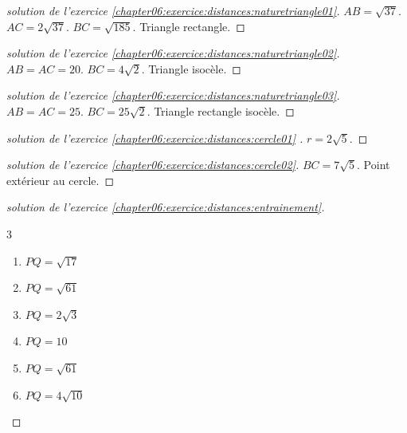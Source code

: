 \begin{proof}[solution de l'exercice \ref{chapter06:exercice:distances:naturetriangle01}]   
	$AB=\sqrt{37}$. $AC=2\sqrt{37}$. $BC=\sqrt{185}$. Triangle   rectangle. 
\end{proof}
\begin{proof}[solution de l'exercice \ref{chapter06:exercice:distances:naturetriangle02}] \hfill 
	$AB=AC=20$. $BC=4\sqrt{2}$. Triangle   isocèle. 
\end{proof}
\begin{proof}[solution de l'exercice \ref{chapter06:exercice:distances:naturetriangle03}]   
	$AB=AC=25$. $BC=25\sqrt{2}$. Triangle rectangle isocèle. 
\end{proof}
\begin{proof}[solution de l'exercice \ref{chapter06:exercice:distances:cercle01} ]   
	$r=2\sqrt{5}$.
\end{proof}
\begin{proof}[solution de l'exercice \ref{chapter06:exercice:distances:cercle02}]   
	$BC=7\sqrt{5}$. Point extérieur au cercle.
\end{proof}
\begin{proof}[solution de l'exercice \ref{chapter06:exercice:distances:entrainement}] \hfill 
	\begin{multicols}{3}
		\begin{enumerate}[leftmargin=*,label=\alph*)]
			\item $PQ=\sqrt{17}$
			\item $PQ=\sqrt{61}$
			\item $PQ=2\sqrt{3}$
			\item $PQ=10$
			\item $PQ=\sqrt{61}$
			\item $PQ=4\sqrt{10}$
		\end{enumerate}
	\end{multicols}
\end{proof}

